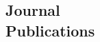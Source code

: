 \documentclass[margin,line]{resume}
\begin{document}
\begin{resume}

    \section{\mysidestyle Journal\\Publications}
      \begin{bibenum}
        \item {}
      \end{bibenum}



\end{resume}
\end{document}
